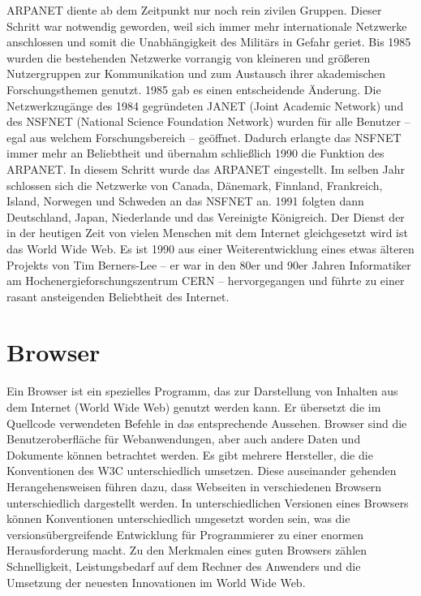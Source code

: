 ARPANET diente ab dem Zeitpunkt nur noch rein zivilen Gruppen. Dieser
Schritt war notwendig geworden, weil sich immer mehr internationale
Netzwerke anschlossen und somit die Unabhängigkeit des Militärs in Gefahr
geriet. Bis 1985 wurden die bestehenden Netzwerke vorrangig von kleineren und
größeren Nutzergruppen zur Kommunikation und zum Austausch ihrer akademischen
Forschungsthemen genutzt.
1985 gab es einen entscheidende Änderung. Die Netzwerkzugänge des 1984
gegründeten JANET (Joint Academic Network) und des NSFNET (National Science
Foundation Network) wurden für alle Benutzer -- egal aus welchem
Forschungsbereich -- geöffnet. Dadurch erlangte das NSFNET immer mehr an
Beliebtheit und übernahm schließlich 1990 die Funktion des ARPANET. In
diesem Schritt wurde das ARPANET eingestellt. Im selben Jahr schlossen sich
die Netzwerke von Canada, Dänemark, Finnland, Frankreich, Island, Norwegen und
Schweden an das NSFNET an. 1991 folgten dann Deutschland, Japan, Niederlande
und das Vereinigte Königreich.
Der Dienst der in der heutigen Zeit von vielen Menschen mit dem Internet
gleichgesetzt wird ist das World Wide Web. Es ist 1990 aus einer
Weiterentwicklung eines etwas älteren Projekts von Tim Berners-Lee -- er war
in den 80er und 90er Jahren Informatiker am Hochenergieforschungszentrum
CERN -- hervorgegangen und führte zu einer rasant ansteigenden Beliebtheit
des Internet.

\section{Browser}
Ein Browser ist ein spezielles Programm, das zur Darstellung von Inhalten aus
dem Internet (World Wide Web) genutzt werden kann. Er übersetzt die im
Quellcode verwendeten Befehle in das entsprechende Aussehen. Browser sind
die Benutzeroberfläche für Webanwendungen, aber auch andere Daten und
Dokumente können betrachtet werden. Es gibt mehrere Hersteller, die die
Konventionen des W3C unterschiedlich umsetzen. Diese auseinander gehenden
Herangehensweisen führen dazu, dass Webseiten in verschiedenen Browsern
unterschiedlich dargestellt werden. In unterschiedlichen Versionen eines
Browsers können Konventionen unterschiedlich umgesetzt worden sein, was die
versionsübergreifende Entwicklung für Programmierer zu einer enormen
Herausforderung macht. Zu den Merkmalen eines guten Browsers zählen
Schnelligkeit, Leistungsbedarf auf dem Rechner des Anwenders und die
Umsetzung der neuesten Innovationen im World Wide Web.

